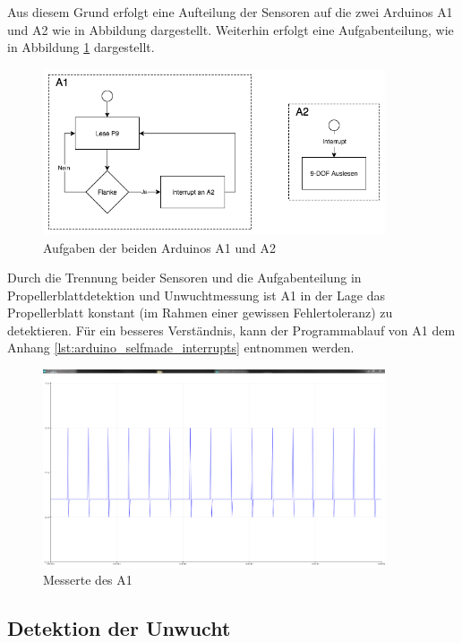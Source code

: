 Aus diesem Grund erfolgt eine Aufteilung der Sensoren auf die zwei Arduinos \ac{A1} und \ac{A2} wie in Abbildung  dargestellt. 
Weiterhin erfolgt eine Aufgabenteilung, wie in Abbildung \ref{fig:aufgaben-arduinos} dargestellt.
\begin{figure}[H]
	\centering
	\includegraphics[width=0.9\textwidth]{images/chapter/03/aufgaben-arduinos.png}
	\caption{Aufgaben der beiden Arduinos \ac{A1} und \ac{A2}}
	\label{fig:aufgaben-arduinos}
\end{figure}
Durch die Trennung beider Sensoren und die Aufgabenteilung in Propellerblattdetektion und Unwuchtmessung ist \ac{A1} in der Lage das Propellerblatt konstant (im Rahmen einer gewissen Fehlertoleranz) zu detektieren.
Für ein besseres Verständnis, kann der Programmablauf von \ac{A1} dem Anhang \ref{lst:arduino_selfmade_interrupts} entnommen werden.
\begin{figure}[H]
	\centering
	\includegraphics[width=0.9\textwidth]{images/chapter/03/self_made_interrupt_a1.png}
	\caption{Messerte des \ac{A1}}
	\label{fig:self_made_interrupt_a1}
\end{figure}

\subsection{Detektion der Unwucht}
\label{subsec:detektion_der_unwucht}

